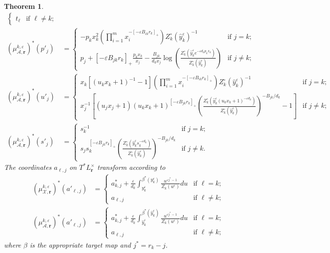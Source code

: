 \documentclass{amsart}
\newtheorem{theorem}{Theorem}[section]
\numberwithin{equation}{section}
\newcommand{\bfr}{{\boldsymbol{r}}}
\newcommand{\cA}{\mathcal{A}}
\newcommand{\cX}{\mathcal{X}}
\begin{document}
\begin{theorem}
\begin{align}
\begin{cases}
      t_\ell & \text{if $\ell\ne k$;}
    \end{cases}\\
    \nonumber
    (\mu_{\cA,\bfr}^{k,\varepsilon})^*(p'_j)&=
    \begin{cases} 
      -p_k x_k^2 \left(\prod_{i=1}^m x_i^{-[-\varepsilon B_{ik} r_k]_+}\right) Z_k^\circ(\hat y_k^\varepsilon)^{-1} & \text{if $j=k$;}\\ 
      p_j + [-\varepsilon B_{jk} r_k]_+ \frac{p_k x_k}{x_j} - \frac{B_{jk}}{d_k x_j}\log\left(\frac{Z_k^\circ\left(\hat y_k^\varepsilon e^{-\varepsilon d_kp_kx_k}\right)}{Z_k^\circ(\hat y_k^\varepsilon)}\right) & \text{if $j\ne k$;}
    \end{cases}\\
    \nonumber
    (\mu_{\cA,\bfr}^{k,\varepsilon})^*(u'_j)
    &=\begin{cases}
      x_k \left[ (u_k x_k +1)^{-1} -1\right] \left(\prod_{i=1}^m x_i^{-[-\varepsilon B_{ik} r_k]_+}\right) Z_k^\circ(\hat y_k^\varepsilon)^{-1} & \text{if $j=k$;}\\ 
      x_j^{-1} \left[ (u_j x_j + 1) (u_k x_k + 1)^{[-\varepsilon B_{jk} r_k]_+} \left(\frac{Z_k^\circ\left(\hat y_k^\varepsilon (u_k x_k +1)^{-\varepsilon d_k}\right)}{Z_k^\circ(\hat y_k^\varepsilon)}\right)^{-B_{jk}/d_k} - 1\right] & \text{if $j\ne k$;}
    \end{cases}\\
    \label{eq:DA mutation}
    (\mu_{\cA,\bfr}^{k,\varepsilon})^*(s'_j)
    &=\begin{cases} 
      s_k^{-1} & \text{if $j=k$;}\\ 
      s_j s_k^{[-\varepsilon B_{jk} r_k]_+} \left(\frac{Z_k^\circ\left(\hat y_k^\varepsilon s_k^{-\varepsilon d_k}\right)}{Z_k^\circ(\hat y_k^\varepsilon)}\right)^{-B_{jk}/d_k} & \text{if $j\ne k$.}
    \end{cases}
  \end{align}
  The coordinates $a_{\ell,j}$ on $T^*L^\times_\bfr$ transform according to
  \begin{align*}
    (\mu_{\cX,\bfr}^{k,\varepsilon})^*(a'_{\ell,j})
    &=\begin{cases}
      a^*_{k,j}+\frac{\varepsilon}{d_k}\int_{y_k^\varepsilon}^{\beta^*(y_k^\varepsilon)} \frac{u^{\varepsilon j^*-1}}{Z_k(u^\varepsilon)}du & \text{if $\ell=k$;}\\
      a_{\ell,j} & \text{if $\ell\ne k$;}
    \end{cases}\\
    (\mu_{\cA,\bfr}^{k,\varepsilon})^*(a'_{\ell,j})
    &=\begin{cases}
      a^*_{k,j}+\frac{\varepsilon}{d_k}\int_{\hat y_k^\varepsilon}^{\beta^*(\hat y_k^\varepsilon)} \frac{u^{\varepsilon j^*-1}}{Z_k(u^\varepsilon)}du & \text{if $\ell=k$;}\\
      a_{\ell,j} & \text{if $\ell\ne k$;}
    \end{cases}
  \end{align*}
  where $\beta$ is the appropriate target map and $j^*=r_k-j$.
\end{theorem}
\end{document}
